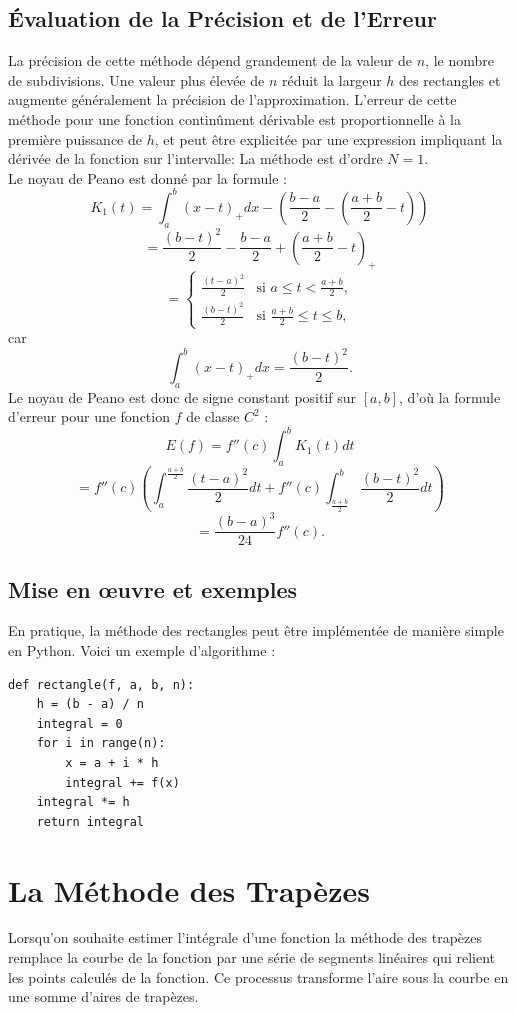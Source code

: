 \documentclass[12pt,a4paper]{article}
\begin{document}
\subsection{Évaluation de la Précision et de l'Erreur}
La précision de cette méthode dépend grandement de la valeur de $n$, le nombre de subdivisions. Une valeur plus élevée de $n$ réduit la largeur $h$ des rectangles et augmente généralement la précision de l'approximation. L'erreur de cette méthode pour une fonction continûment dérivable est proportionnelle à la première puissance de $h$, et peut être explicitée par une expression impliquant la dérivée de la fonction sur l'intervalle:
La méthode est d'ordre $N = 1$.\\
Le noyau de Peano est donné par la formule :
\[
K_1(t) = \int_{a}^{b} (x - t)_+ dx - \left( \frac{b-a}{2} - \left( \frac{a+b}{2} - t \right) \right)
\]
\[
= \frac{(b-t)^2}{2} - \frac{b-a}{2} + \left( \frac{a+b}{2} - t \right)_+
\]
\[
= \begin{cases}
\frac{(t-a)^2}{2} & \text{si } a \leq t < \frac{a+b}{2}, \\
\frac{(b-t)^2}{2} & \text{si } \frac{a+b}{2} \leq t \leq b,
\end{cases}
\]
car
\[
\int_{a}^{b} (x-t)_+ dx = \frac{(b-t)^2}{2}.
\]
Le noyau de Peano est donc de signe constant positif sur $[a, b]$, d'où la formule d'erreur pour une fonction $f$ de classe $C^2$ :
\[
E(f) = f''(c) \int_{a}^{b} K_1(t) dt
\]
\[
= f''(c) \left( \int_{a}^{\frac{a+b}{2}} \frac{(t-a)^2}{2} dt + f''(c) \int_{\frac{a+b}{2}}^{b} \frac{(b-t)^2}{2} dt \right)
\]
\[
= \frac{(b-a)^3}{24} f''(c).
\]
\subsection{Mise en œuvre et exemples}

En pratique, la méthode des rectangles peut être implémentée de manière simple en Python. Voici un exemple d'algorithme :
\begin{lstlisting}
def rectangle(f, a, b, n):
    h = (b - a) / n
    integral = 0
    for i in range(n):
        x = a + i * h
        integral += f(x)
    integral *= h
    return integral
\end{lstlisting}


\section{La Méthode des Trapèzes}
Lorsqu'on souhaite estimer l'intégrale d'une fonction la méthode des trapèzes remplace la courbe de la fonction par une série de segments linéaires qui relient les points calculés de la fonction. Ce processus transforme l'aire sous la courbe en une somme d'aires de trapèzes.
\end{document}
